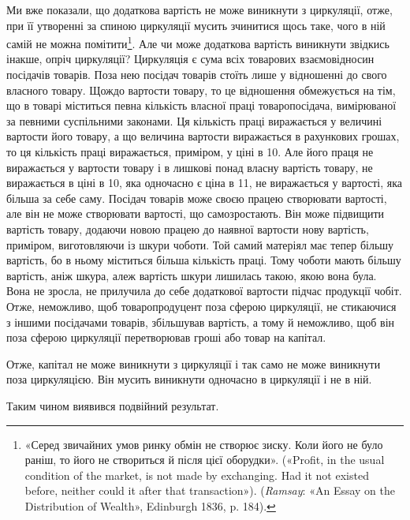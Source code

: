 
Ми вже показали, що додаткова вартість не може виникнути
з циркуляції, отже, при її утворенні за спиною циркуляції мусить
зчинитися щось таке, чого в ній самій не можна помітити\footnote{
«Серед звичайних умов ринку обмін не створює зиску. Коли його
не було раніш, то його не створиться й після цієї оборудки». («Profit, in
the usual condition of the market, is not made by exchanging. Had it not
existed before, neither could it after that transaction»). (\emph{Ramsay}: «An
Essay on the Distribution of Wealth», Edinburgh 1836, p. 184).
}. Але
чи може додаткова вартість виникнути звідкись інакше, опріч
циркуляції? Циркуляція є сума всіх товарових взаємовідносин
посідачів товарів. Поза нею посідач товарів стоїть лише у відношенні
до свого власного товару. Щождо вартости товару, то це
відношення обмежується на тім, що в товарі міститься певна
кількість власної праці товаропосідача, вимірюваної за певними
суспільними законами. Ця кількість праці виражається у величині
вартости його товару, а що величина вартости виражається
в рахункових грошах, то ця кількість праці виражається, приміром,
у ціні в 10. Але його праця не виражається
у вартости товару і в лишкові понад власну вартість товару,
не виражається в ціні в 10, яка одночасно є ціна в 11, не виражається
у вартості, яка більша за себе саму. Посідач товарів
може своєю працею створювати вартості, але він не може створювати
вартості, що самозростають. Він може підвищити вартість
товару, додаючи новою працею до наявної вартости нову вартість,
приміром, виготовляючи із шкури чоботи. Той самий матеріял
має тепер більшу вартість, бо в ньому міститься більша кількість
праці. Тому чоботи мають більшу вартість, аніж шкура, алеж вартість
шкури лишилась такою, якою вона була. Вона не зросла,
не прилучила до себе додаткової вартости підчас продукції чобіт.
Отже, неможливо, щоб товаропродуцент поза сферою циркуляції,
не стикаючися з іншими посідачами товарів, збільшував вартість,
а тому й неможливо, щоб він поза сферою циркуляції перетворював
гроші або товар на капітал.

Отже, капітал не може виникнути з циркуляції і так само не
може виникнути поза циркуляцією. Він мусить виникнути одночасно
в циркуляції і не в ній.

Таким чином виявився подвійний результат.


